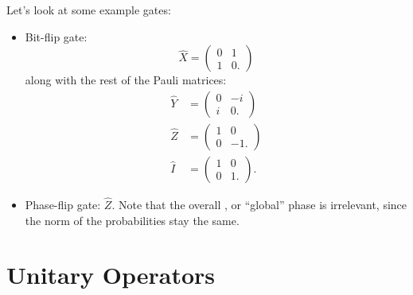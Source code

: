 \documentclass{article}
\numberwithin{equation}{section}
\begin{document}
Let's look at some example gates:
\begin{itemize}
    \item Bit-flip gate:
    \begin{equation}
        \hat{X} = \begin{pmatrix}
            0 & 1 \\ 
            1 & 0.
        \end{pmatrix}
    \end{equation}
    along with the rest of the Pauli matrices:
    \begin{align}
        \hat{Y} &= \begin{pmatrix}
            0 & -i \\ 
            i & 0.
        \end{pmatrix} \\ 
        \hat{Z} &= \begin{pmatrix}
            1 & 0 \\ 
            0 & -1.
        \end{pmatrix} \\
        \hat{I} &= \begin{pmatrix}
            1 & 0 \\ 
            0 & 1.
        \end{pmatrix}.
    \end{align}
    \item Phase-flip gate: $\hat{Z}.$ Note that the overall , or ``global'' phase is irrelevant, since the norm of the probabilities stay the same.
\end{itemize}
\section{Unitary Operators}
\end{document}
